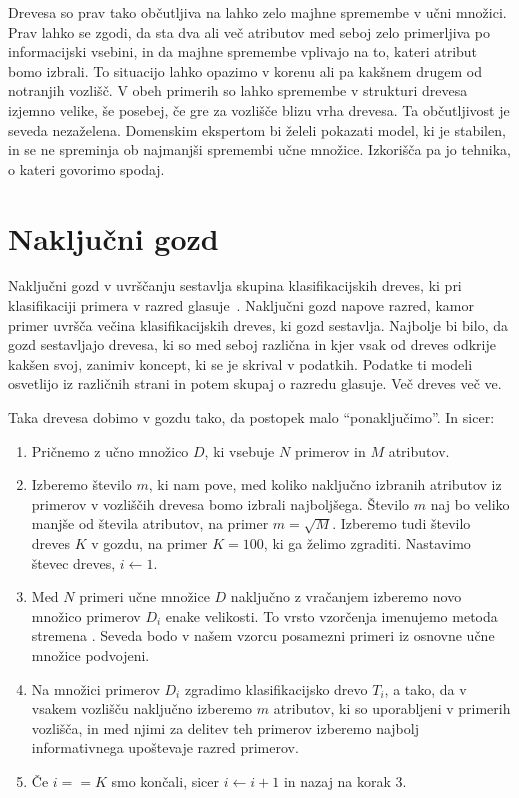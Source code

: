 Drevesa so prav tako občutljiva na lahko zelo majhne spremembe v učni množici. Prav lahko se zgodi, da sta dva ali več atributov med seboj zelo primerljiva po informacijski vsebini, in da majhne spremembe vplivajo na to, kateri atribut bomo izbrali. To situacijo lahko opazimo v korenu ali pa kakšnem drugem od notranjih vozlišč. V obeh primerih so lahko spremembe v strukturi drevesa izjemno velike, še posebej, če gre za vozlišče blizu vrha drevesa. Ta občutljivost je seveda nezaželena. Domenskim ekspertom bi želeli pokazati model, ki je stabilen, in se ne spreminja ob najmanjši spremembi učne množice. Izkorišča pa jo tehnika, o kateri govorimo spodaj.

\section{Naključni gozd}

Naključni gozd  v uvrščanju sestavlja skupina klasifikacijskih dreves, ki pri klasifikaciji primera v razred glasuje~\cite{}. Naključni gozd napove razred, kamor primer uvršča večina klasifikacijskih dreves, ki gozd sestavlja. Najbolje bi bilo, da gozd sestavljajo drevesa, ki so med seboj različna in kjer vsak od dreves odkrije kakšen svoj, zanimiv koncept, ki se je skrival v podatkih. Podatke ti modeli osvetlijo iz različnih strani in potem skupaj o razredu glasuje. Več dreves več ve.

Taka drevesa dobimo v gozdu tako, da postopek malo ``ponaključimo''. In sicer:
\begin{enumerate}
\item Pričnemo z učno množico $D$, ki vsebuje $N$ primerov in $M$ atributov.
\item Izberemo število $m$, ki nam pove, med koliko naključno izbranih atributov iz primerov v vozliščih drevesa bomo izbrali najboljšega. Število $m$ naj bo veliko manjše od števila atributov, na primer $m=\sqrt{M}$. Izberemo tudi število dreves $K$ v gozdu, na primer $K=100$, ki ga želimo zgraditi. Nastavimo števec dreves, $i\leftarrow 1$.
\item Med $N$ primeri učne množice $D$ naključno z vračanjem izberemo novo množico primerov $D_i$ enake velikosti. To vrsto vzorčenja imenujemo metoda stremena . Seveda bodo v našem vzorcu posamezni primeri iz osnovne učne množice podvojeni.
\item Na množici primerov $D_i$ zgradimo klasifikacijsko drevo $T_i$, a tako, da v vsakem vozlišču naključno izberemo $m$ atributov, ki so uporabljeni v primerih vozlišča, in med njimi za delitev teh primerov izberemo najbolj informativnega upoštevaje razred primerov.
\item Če $i==K$ smo končali, sicer $i\leftarrow i+1$ in nazaj na korak 3.
\end{enumerate}

